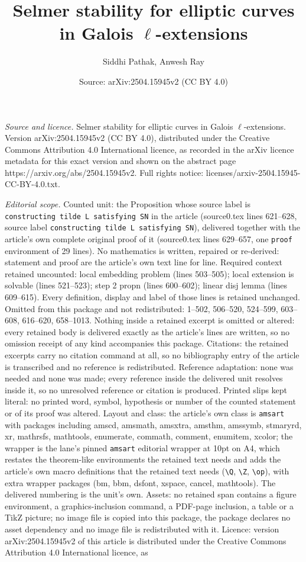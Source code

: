 \documentclass[10pt,a4paper]{amsart}
\title[Selmer stability for elliptic curves in Galois $\ell$-extens]{Selmer stability for elliptic curves in Galois $\ell$-extensions}
\author{Siddhi Pathak, Anwesh Ray}
\date{Source: arXiv:2504.15945v2 (CC BY 4.0)}
\begin{document}
\maketitle

\noindent\emph{Source and licence.} Selmer stability for elliptic curves in Galois $\ell$-extensions. Version arXiv:2504.15945v2 (CC BY 4.0), distributed under the Creative Commons Attribution 4.0 International licence, as recorded in the arXiv licence metadata for this exact version and shown on the abstract page https://arxiv.org/abs/2504.15945v2. Full rights notice: licenses/arxiv-2504.15945-CC-BY-4.0.txt.\par\smallskip

\noindent\textit{Editorial scope.} Counted unit: the Proposition whose source label is \texttt{constructing tilde L satisfying SN} in the article (source0.tex lines 621--628, source label \texttt{constructing tilde L satisfying SN}), delivered together with the article's own complete original proof of it (source0.tex lines 629--657, one \texttt{proof} environment of 29 lines). No mathematics is written, repaired or re-derived: statement and proof are the article's own text line for line. Required context retained uncounted: local embedding problem (lines 503--505); local extension is solvable (lines 521--523); step 2 propn (lines 600--602); linear disj lemma (lines 609--615). Every definition, display and label of those lines is retained unchanged. Omitted from this package and not redistributed: 1--502, 506--520, 524--599, 603--608, 616--620, 658--1013. Nothing inside a retained excerpt is omitted or altered: every retained body is delivered exactly as the article's lines are written, so no omission receipt of any kind accompanies this package. Citations: the retained excerpts carry no citation command at all, so no bibliography entry of the article is transcribed and no reference is redistributed. Reference adaptation: none was needed and none was made; every reference inside the delivered unit resolves inside it, so no unresolved reference or citation is produced. Printed slips kept literal: no printed word, symbol, hypothesis or number of the counted statement or of its proof was altered. Layout and class: the article's own class is \texttt{amsart} with packages including amscd, amsmath, amsxtra, amsthm, amssymb, stmaryrd, xr, mathrsfs, mathtools, enumerate, commath, comment, enumitem, xcolor; the wrapper is the lane's pinned \texttt{amsart} editorial wrapper at 10pt on A4, which restates the theorem-like environments the retained text needs and adds the article's own macro definitions that the retained text needs (\texttt{\textbackslash Q}, \texttt{\textbackslash Z}, \texttt{\textbackslash op}), with extra wrapper packages (bm, bbm, dsfont, xspace, cancel, mathtools). The delivered numbering is the unit's own. Assets: no retained span contains a figure environment, a graphics-inclusion command, a PDF-page inclusion, a table or a TikZ picture; no image file is copied into this package, the package declares no asset dependency and no image file is redistributed with it. Licence: version arXiv:2504.15945v2 of this article is distributed under the Creative Commons Attribution 4.0 International licence, as 
\end{document}

